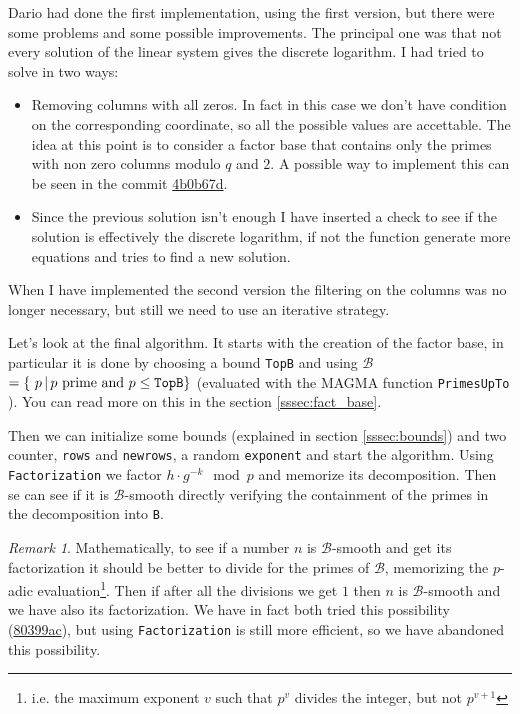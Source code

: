 \documentclass{article}
\newcommand{\BB}{\mathcal{B}}
\theoremstyle{plain}
\theoremstyle{remark}
\newtheorem{rem}{Remark}
\theoremstyle{definition}
\begin{document}
Dario had done the first implementation, using the first version, but there were some problems and some possible improvements. The principal one was that not every solution of the linear system gives the discrete logarithm. I had tried to solve in two ways:
\begin{itemize}
	\item Removing columns with all zeros. In fact in this case we don't have condition on the corresponding coordinate, so all the possible values are accettable. The idea at this point is to consider a factor base that contains only the primes with non zero columns modulo $q$ and $2$. A possible way to implement this can be seen in the commit \href{https://github.com/giacomoborin/project2_MAGMA/pull/30/commits/4b0b67d0dcbe51f01058c64a06a1c39fdb5cf56e}{4b0b67d}.
	\item Since the previous solution isn't enough I have inserted a check to see if the solution is effectively the discrete logarithm, if not the function generate more equations and tries to find a new solution.  
\end{itemize}

When I have implemented the second version the filtering on the columns was no longer necessary, but still we need to use an iterative strategy. 

Let's look at the final algorithm. It starts with the creation of the factor base, in particular it is done by choosing a bound \texttt{TopB} and using $\BB $$= \{ p \,|\, p \text{ prime and } p \leq \verb|TopB|\}$ (evaluated with the MAGMA function \texttt{PrimesUpTo} ). You can read more on this in the section \ref{sssec:fact_base}. 

Then we can initialize some bounds (explained in section \ref{sssec:bounds}) and two counter, \texttt{rows} and \texttt{newrows}, a random \texttt{exponent} and start the algorithm. Using \\ \texttt{Factorization} we factor $h\cdot g^{-k} \mod p$ and memorize its decomposition. Then se can see if it is $\BB$-smooth directly verifying the containment of the primes in the decomposition into \texttt{B}.

\begin{rem}
	Mathematically, to see if a number $n$ is $\mathcal{B}$-smooth and get its factorization it should be better to divide for the primes of $\BB$, memorizing the $p$-adic evaluation\footnote{i.e. the maximum exponent $v$ such that $p^v$ divides the integer, but not $p^{v+1}$}. Then if after all the divisions we get $1$ then $n$ is $\BB$-smooth and we have also its factorization. 
	We have in fact both tried this possibility (\href{https://github.com/giacomoborin/project2_MAGMA/commit/80399ac928cf19e009451f174adc4138283580f2}{80399ac}), but using \texttt{Factorization} is still more efficient, so we have abandoned this possibility. 
\end{rem}
\end{document}
